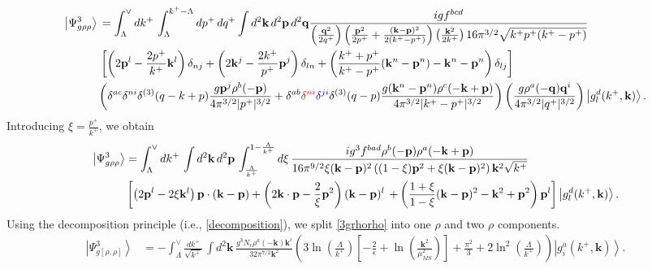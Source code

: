\documentclass[10pt]{article}
\numberwithin{equation}{section}
\begin{document}
\begin{align}\label{part2}
\left|\Psi_{g\rho\rho}^{3}\right\rangle \, & =\int_{\Lambda}^{\vee}dk^{+}\,\int_{\Lambda}^{k^{+}-\Lambda}dp^{+}\, dq^{+}\int d^{2}\mathbf{k}\, d^{2}\mathbf{p}\, d^{2}\mathbf{q}  \frac{igf^{bcd}}{\left(\frac{\mathbf{q}^{2}}{2q^{+}}\right)\left(\frac{\mathbf{p}^{2}}{2p^{+}}+\frac{(\mathbf{k}-\mathbf{p})^{2}}{2(k^{+}-p^{+})}\right)\left(\frac{\mathbf{k}^{2}}{2k^{+}}\right)16\pi^{3/2}\sqrt{k^{+}p^{+}(k^{+}-p^{+})}}\notag \\ &\left[\left(2\mathbf{p}^{l}-\frac{2p^{+}}{k^{+}}\mathbf{k}^{l}\right)\delta_{nj}+\left(2\mathbf{k}^{j}-\frac{2k^{+}}{p^{+}}\mathbf{p}^{j}\right)\delta_{ln}+\left(\frac{k^{+}+p^{+}}{k^{+}-p^{+}}(\mathbf{k}^{n}-\mathbf{p}^{n})-\mathbf{k}^{n}-\mathbf{p}^{n}\right)\delta_{lj}\right]\notag \\ &\bigg(\delta^{ac}\delta^{ni}\delta^{(3)}(q-k+p)\frac{g\mathbf{p}^{j}\rho^{b}(-\mathbf{p})}{4\pi^{3/2}|p^{+}|^{3/2}}+\delta^{ab}\textcolor{red}{\delta^{ni}}\textcolor{blue}{\delta^{ji}}\delta^{(3)}(q-p)\frac{g(\mathbf{k}^{n}-\mathbf{p}^{n})\rho^{c}(-\mathbf{k}+\mathbf{p})}{4\pi^{3/2}|k^{+}-p^{+}|^{3/2}}\bigg)\left(\frac{g\rho^{a}(-\mathbf{q})\mathbf{q}^{i}}{4\pi^{3/2}|q^{+}|^{3/2}}\right)\left|g_{l}^{d}(k^{+},\mathbf{k})\right\rangle.
\end{align}
Introducing $\xi = \frac{p^{+}}{k^{+}}$, we obtain
 \begin{align}\label{3grhorho}
\left|\Psi_{g\rho\rho}^{3}\right\rangle & =\int_{\Lambda}^{\vee}dk^{+}\,\int d^{2}\mathbf{k}\, d^{2}\mathbf{p}\,\int_{\frac{\Lambda}{k^{+}}}^{1-\frac{\Lambda}{k^{+}}}d\xi\,\frac{ig^{3}f^{bad}\rho^{b}(-\mathbf{p})\rho^{a}(-\mathbf{k}+\mathbf{p})}{16\pi^{9/2}\xi(\mathbf{k}-\mathbf{p})^{2}\left((1-\xi)\mathbf{p}^{2}+\xi(\mathbf{k}-\mathbf{p})^{2}\right)\mathbf{k}^{2}\sqrt{k^{+}}}\notag \\ & \left[\left(2\mathbf{p}^{l}-2\xi \mathbf{k}^{l}\right)\mathbf{p}\cdot(\mathbf{k}-\mathbf{p})+\left(2\mathbf{k}\cdot \mathbf{p}-\frac{2}{\xi}\mathbf{p}^{2}\right)(\mathbf{k}-\mathbf{p})^{l}\right.\left.+\left(\frac{1+\xi}{1-\xi}(\mathbf{k}-\mathbf{p})^{2}-\mathbf{k}^{2}+\mathbf{p}^{2}\right)\mathbf{p}^{l}\right]\left|g_{l}^{d}(k^{+},\mathbf{k})\right\rangle.
\end{align}
Using the decomposition principle (i.e., \eqref{decomposition}), we split \eqref{3grhorho} into one $\rho$ and two $\rho$ components.
\begin{align}\label{onerho2}
\left|\Psi_{g[\rho,\rho]}^{3}\right\rangle & = -\int_{\Lambda}^{\vee}\frac{dk^{+}}{\sqrt{k^{+}}}\,\int d^{2}\mathbf{k}\,\frac{g^{3}N_{c}\rho^{a}(-\mathbf{k})\mathbf{k}^{i}}{32\pi^{7/2}\mathbf{k}^{2}}\left(3\ln\left(\frac{\Lambda}{k^{+}}\right)\left[-\frac{2}{\epsilon}+\ln\left(\frac{\mathbf{k}^{2}}{\mu_{\overline{MS}}^{2}}\right)\right]+\frac{\pi^{2}}{3}+2\ln^{2}\left(\frac{\Lambda}{k^{+}}\right)\right)\left|g_{i}^{a}(k^{+},\mathbf{k})\right\rangle .
\end{align}
\end{document}
